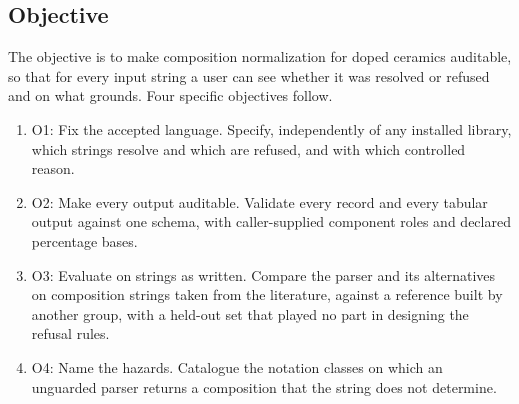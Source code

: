 \documentclass[10pt,journal]{IEEEtran}
\begin{document}
\subsection{Objective}
\label{sec:objective}
The objective is to make composition normalization for doped ceramics auditable, so that for every input string a user can see whether it was resolved or refused and on what grounds. Four specific objectives follow.
\begin{enumerate}
\item O1: Fix the accepted language. Specify, independently of any installed library, which strings resolve and which are refused, and with which controlled reason.
\item O2: Make every output auditable. Validate every record and every tabular output against one schema, with caller-supplied component roles and declared percentage bases.
\item O3: Evaluate on strings as written. Compare the parser and its alternatives on composition strings taken from the literature, against a reference built by another group, with a held-out set that played no part in designing the refusal rules.
\item O4: Name the hazards. Catalogue the notation classes on which an unguarded parser returns a composition that the string does not determine.
\end{enumerate}
\end{document}
